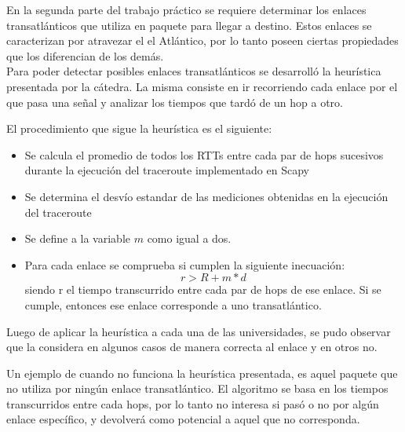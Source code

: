 En la segunda parte del trabajo práctico se requiere determinar los enlaces transatlánticos que utiliza en paquete para llegar a destino. Estos enlaces se caracterizan por atravezar el el Atlántico, por lo tanto poseen ciertas propiedades que los diferencian de los demás. \\

Para poder detectar posibles enlaces transatlánticos se desarrolló la heurística presentada por la cátedra. La misma consiste en ir recorriendo cada enlace por el que pasa una señal y analizar los tiempos que tardó de un hop a otro. 

El procedimiento que sigue la heurística es el siguiente:
\begin{itemize}
	\item Se calcula el promedio de todos los RTTs entre cada par de hops sucesivos durante la ejecución del traceroute implementado en Scapy
	\item Se determina el desvío estandar de las mediciones obtenidas en la ejecución del traceroute
	\item Se define a la variable $m$ como igual a dos.
	\item Para cada enlace se comprueba si cumplen la siguiente inecuación: 
	\begin{equation}
		r > R + m * d
	\end{equation}
	siendo r el tiempo transcurrido entre cada par de hops de ese enlace. Si se cumple, entonces ese enlace corresponde a uno transatlántico.
\end{itemize}

Luego de aplicar la heurística a cada una de las universidades, se pudo observar que la considera en algunos casos de manera correcta al enlace y en otros no. 

Un ejemplo de cuando no funciona la heurística presentada, es aquel paquete que no utiliza por ningún enlace transatlántico. El algoritmo se basa en los tiempos transcurridos entre cada hops, por lo tanto no interesa si pasó o no por algún enlace específico, y devolverá como potencial a aquel que no corresponda. 


